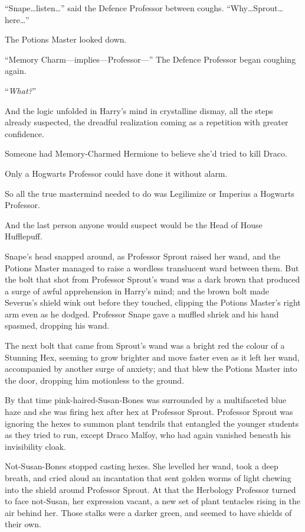 “Snape…listen…” said the Defence Professor between coughs. “Why…Sprout…here…”

The Potions Master looked down.

“Memory Charm—implies—Professor—” The Defence Professor began coughing again.

“\emph{What?}”

And the logic unfolded in Harry’s mind in crystalline dismay, all the steps already suspected, the dreadful realization coming as a repetition with greater confidence.

Someone had Memory-Charmed Hermione to believe she’d tried to kill Draco.

Only a Hogwarts Professor could have done it without alarm.

So all the true mastermind needed to do was Legilimize or Imperius a Hogwarts Professor.

And the last person anyone would suspect would be the Head of House Hufflepuff.

Snape’s head snapped around, as Professor Sprout raised her wand, and the Potions Master managed to raise a wordless translucent ward between them. But the bolt that shot from Professor Sprout’s wand was a dark brown that produced a surge of awful apprehension in Harry’s mind; and the brown bolt made Severus’s shield wink out before they touched, clipping the Potions Master’s right arm even as he dodged. Professor Snape gave a muffled shriek and his hand spasmed, dropping his wand.

The next bolt that came from Sprout’s wand was a bright red the colour of a Stunning Hex, seeming to grow brighter and move faster even as it left her wand, accompanied by another surge of anxiety; and that blew the Potions Master into the door, dropping him motionless to the ground.

By that time pink-haired-Susan-Bones was surrounded by a multifaceted blue haze and she was firing hex after hex at Professor Sprout. Professor Sprout was ignoring the hexes to summon plant tendrils that entangled the younger students as they tried to run, except Draco Malfoy, who had again vanished beneath his invisibility cloak.

Not-Susan-Bones stopped casting hexes. She levelled her wand, took a deep breath, and cried aloud an incantation that sent golden worms of light chewing into the shield around Professor Sprout. At that the Herbology Professor turned to face not-Susan, her expression vacant, a new set of plant tentacles rising in the air behind her. Those stalks were a darker green, and seemed to have shields of their own.

